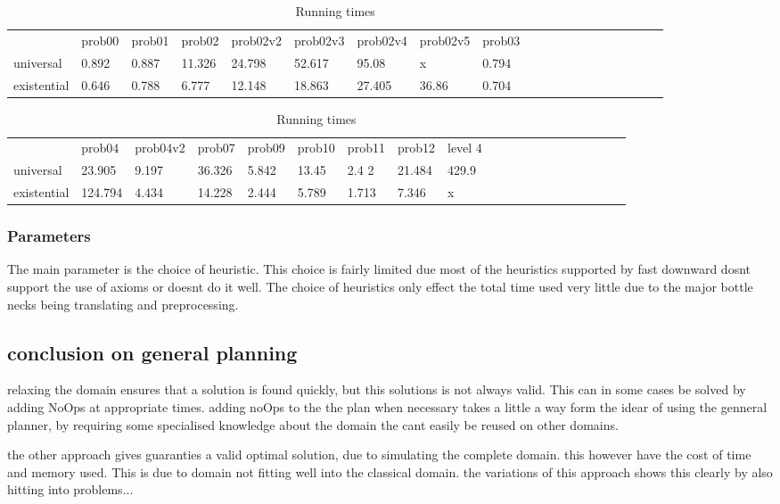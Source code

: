 			\begin{table}[h]
				\centering
				\caption{Running times}
				\label{times}
				\begin{tabular}{llllllllllllllllllll}
					& prob00 & prob01& prob02& prob02v2& prob02v3& prob02v4& prob02v5& prob03\\
					universal 	& 0.892  &0.887  &11.326 &24.798   &52.617   &95.08    & x       &0.794    \\
					existential &0.646   &0.788  &6.777  &12.148   &18.863   &27.405   &36.86    &0.704  \\
				\end{tabular}
				\begin{tabular}{llllllllllllllllllll}
					&  prob04& prob04v2& prob07&  prob09& prob10& prob11& prob12 & level 4\\
					universal    &23.905  &9.197      &36.326   &5.842  &13.45  &2.4 2           &21.484 &429.9\\
					existential      &124.794 &4.434   &14.228 &2.444  &5.789  &1.713        &7.346 & x\\
				\end{tabular}
			\end{table}


\subsubsection{Parameters}
The main parameter is the choice of heuristic. This choice is fairly limited due most of the heuristics supported by fast downward dosnt support the use of axioms or doesnt do it well. The choice of heuristics only effect the total time used very little due to the major bottle necks being translating and preprocessing.




\subsection{conclusion on general planning}
	relaxing the domain ensures that a solution is found quickly, but this solutions is not always valid. This can in some cases be solved by adding NoOps at appropriate times.
	adding noOps to the the plan when necessary takes a little a way form the idear of using the genneral planner, by requiring some specialised knowledge about the domain the cant easily be reused on other domains.
	
	the other approach gives guaranties a valid optimal solution, due to simulating the complete domain. this however have the cost of time and memory used. This is due to domain not fitting well into the classical domain. 
	the variations of this approach shows this clearly by also hitting into problems... 